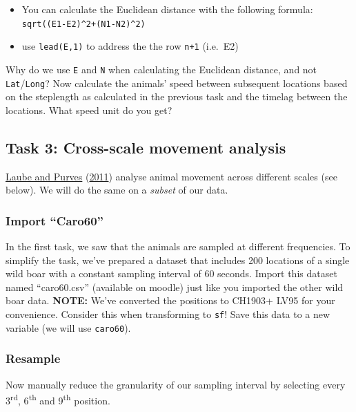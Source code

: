 \documentclass[
]{book}
\providecommand{\tightlist}{%
  \setlength{\itemsep}{0pt}\setlength{\parskip}{0pt}}
\begin{document}
\begin{itemize}
\tightlist
\item
  You can calculate the Euclidean distance with the following formula: \texttt{sqrt((E1-E2)\^{}2+(N1-N2)\^{}2)}
\item
  use \texttt{lead(E,1)} to address the the row \texttt{n+1} (i.e.~E2)
\end{itemize}

Why do we use \texttt{E} and \texttt{N} when calculating the Euclidean distance, and not \texttt{Lat}/\texttt{Long}? Now calculate the animals' speed between subsequent locations based on the steplength as calculated in the previous task and the timelag between the locations. What speed unit do you get?

\hypertarget{task-3-cross-scale-movement-analysis}{%
\subsection{Task 3: Cross-scale movement analysis}\label{task-3-cross-scale-movement-analysis}}

\protect\hyperlink{ref-laube2011}{Laube and Purves} (\protect\hyperlink{ref-laube2011}{2011}) analyse animal movement across different scales (see below). We will do the same on a \emph{subset} of our data.

\hypertarget{import-caro60}{%
\subsubsection{Import ``Caro60''}\label{import-caro60}}

In the first task, we saw that the animals are sampled at different frequencies. To simplify the task, we've prepared a dataset that includes 200 locations of a single wild boar with a constant sampling interval of 60 seconds. Import this dataset named ``caro60.csv'' (available on moodle) just like you imported the other wild boar data. \textbf{NOTE:} We've converted the positions to CH1903+ LV95 for your convenience. Consider this when transforming to \texttt{sf}!
Save this data to a new variable (we will use \texttt{caro60}).

\hypertarget{resample}{%
\subsubsection{Resample}\label{resample}}

Now manually reduce the granularity of our sampling interval by selecting every 3\textsuperscript{rd}, 6\textsuperscript{th} and 9\textsuperscript{th} position.
\end{document}
